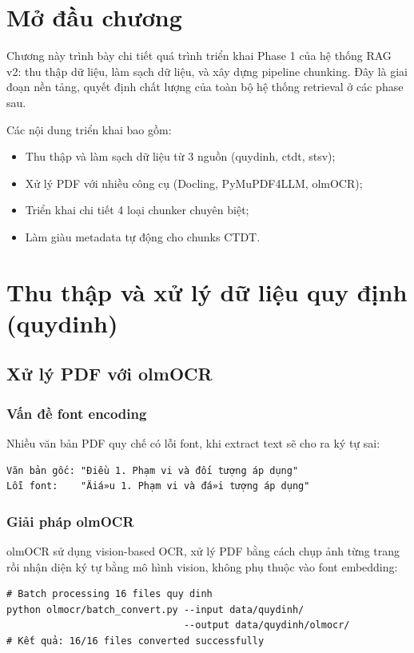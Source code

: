 \documentclass[../DoAn.tex]{subfiles}
\begin{document}
\section{Mở đầu chương}
Chương này trình bày chi tiết quá trình triển khai Phase 1 của hệ thống RAG v2: thu thập dữ liệu, làm sạch dữ liệu, và xây dựng pipeline chunking. Đây là giai đoạn nền tảng, quyết định chất lượng của toàn bộ hệ thống retrieval ở các phase sau.

Các nội dung triển khai bao gồm:
\begin{itemize}
    \item Thu thập và làm sạch dữ liệu từ 3 nguồn (quydinh, ctdt, stsv);
    \item Xử lý PDF với nhiều công cụ (Docling, PyMuPDF4LLM, olmOCR);
    \item Triển khai chi tiết 4 loại chunker chuyên biệt;
    \item Làm giàu metadata tự động cho chunks CTDT.
\end{itemize}

\section{Thu thập và xử lý dữ liệu quy định (quydinh)}

\subsection{Xử lý PDF với olmOCR}

\subsubsection{Vấn đề font encoding}
Nhiều văn bản PDF quy chế có lỗi font, khi extract text sẽ cho ra ký tự sai:
\begin{verbatim}
Văn bản gốc: "Điều 1. Phạm vi và đối tượng áp dụng"
Lỗi font:    "Äiá»u 1. Phạm vi và đá»i tượng áp dụng"
\end{verbatim}

\subsubsection{Giải pháp olmOCR}
olmOCR sử dụng vision-based OCR, xử lý PDF bằng cách chụp ảnh từng trang rồi nhận diện ký tự bằng mô hình vision, không phụ thuộc vào font embedding:
\begin{verbatim}
# Batch processing 16 files quy dinh
python olmocr/batch_convert.py --input data/quydinh/ 
                               --output data/quydinh/olmocr/
# Kết quả: 16/16 files converted successfully
\end{verbatim}
\end{document}
